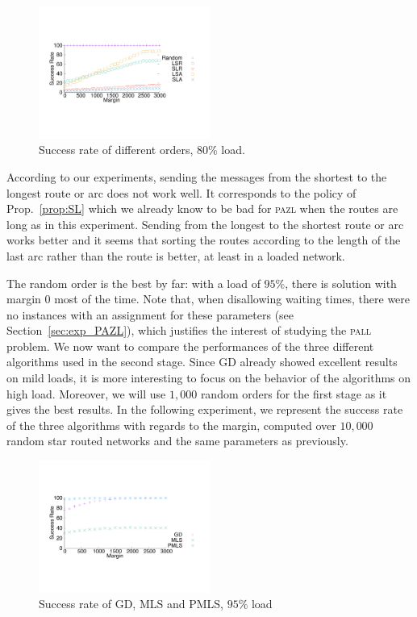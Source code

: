 \documentclass[10pt, conference, letterpaper]{IEEEtran}
\newcommand\pazl{\textsc{pazl}\xspace}
\newcommand\pall{\textsc{pall}\xspace}
\begin{document}
\begin{figure}[h] 
  \centering
          \includegraphics[width=0.5\textwidth]{departs_gp_25000.pdf}
          \vspace{-0.5cm}
      \caption{Success rate of different orders, $80\%$ load.}
           \label{fig:success80}
     \end{figure}
     
     According to our experiments, sending the messages from the shortest to the longest route or arc does not work well. It corresponds to the policy of Prop.~\ref{prop:SL} which we already know to be bad for \pazl when the routes are long as in this experiment. Sending from the longest to the shortest route or arc works better and it seems that sorting the routes according to the length of the last arc rather than the route is better, at least in a loaded network. 
     
     The random order is the best by far: with a load of $95\%$, there is solution with margin $0$ most of the time. Note that, when disallowing waiting times, there were no instances with an assignment for these parameters (see Section~\ref{sec:exp_PAZL}), which justifies the interest of studying the \pall problem. We now want to compare the performances of the three different algorithms used in the second stage. Since GD already showed excellent results on mild loads, it is more interesting to focus on the behavior of the algorithms on high load. Moreover, we will use $1,000$ random orders for the first stage as it gives the best results. In the following experiment, we represent the success rate of the three algorithms with regards to the margin,  computed over $10,000$ random star routed networks and the same parameters as previously.
     
    \begin{figure} [h] 
       \begin{center}
      \includegraphics[width=0.5\textwidth]{retour_21000.pdf}
      \end{center}
      \caption{Success rate of GD, MLS and PMLS, $95\%$ load}
     \label{fig:success21000}
     \end{figure}
\end{document}
